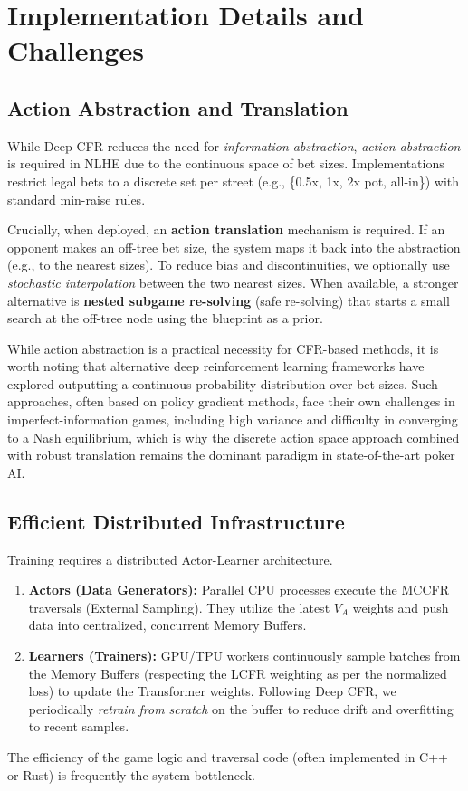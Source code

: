 \documentclass[11pt,a4paper]{article}
\begin{document}
\section{Implementation Details and Challenges}

\subsection{Action Abstraction and Translation}

While Deep CFR reduces the need for \textit{information abstraction}, \textit{action abstraction} is required in NLHE due to the continuous space of bet sizes. Implementations restrict legal bets to a discrete set per street (e.g., \{0.5x, 1x, 2x pot, all-in\}) with standard min-raise rules.

Crucially, when deployed, an \textbf{action translation} mechanism is required. If an opponent makes an off-tree bet size, the system maps it back into the abstraction (e.g., to the nearest sizes). To reduce bias and discontinuities, we optionally use \emph{stochastic interpolation} between the two nearest sizes. When available, a stronger alternative is \textbf{nested subgame re-solving} (safe re-solving) that starts a small search at the off-tree node using the blueprint as a prior.

While action abstraction is a practical necessity for CFR-based methods, it is worth noting that alternative deep reinforcement learning frameworks have explored outputting a continuous probability distribution over bet sizes. Such approaches, often based on policy gradient methods, face their own challenges in imperfect-information games, including high variance and difficulty in converging to a Nash equilibrium, which is why the discrete action space approach combined with robust translation remains the dominant paradigm in state-of-the-art poker AI.

\subsection{Efficient Distributed Infrastructure}

Training requires a distributed Actor-Learner architecture.
\begin{enumerate}
    \item \textbf{Actors (Data Generators):} Parallel CPU processes execute the MCCFR traversals (External Sampling). They utilize the latest $V_A$ weights and push data into centralized, concurrent Memory Buffers.
    \item \textbf{Learners (Trainers):} GPU/TPU workers continuously sample batches from the Memory Buffers (respecting the LCFR weighting as per the normalized loss) to update the Transformer weights. Following Deep CFR, we periodically \emph{retrain from scratch} on the buffer to reduce drift and overfitting to recent samples.
\end{enumerate}
The efficiency of the game logic and traversal code (often implemented in C++ or Rust) is frequently the system bottleneck.
\end{document}
